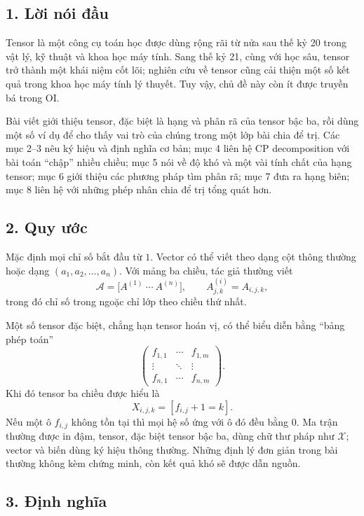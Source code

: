 \documentclass[11pt]{article}
\begin{document}
\subsection*{1. Lời nói đầu}

Tensor là một công cụ toán học được dùng rộng rãi từ nửa sau thế kỷ 20 trong
vật lý, kỹ thuật và khoa học máy tính. Sang thế kỷ 21, cùng với học sâu,
tensor trở thành một khái niệm cốt lõi; nghiên cứu về tensor cũng cải thiện
một số kết quả trong khoa học máy tính lý thuyết. Tuy vậy, chủ đề này còn ít
được truyền bá trong OI.

Bài viết giới thiệu tensor, đặc biệt là hạng và phân rã của tensor bậc ba, rồi
dùng một số ví dụ để cho thấy vai trò của chúng trong một lớp bài chia để trị.
Các mục 2--3 nêu ký hiệu và định nghĩa cơ bản; mục 4 liên hệ CP decomposition
với bài toán ``chập'' nhiều chiều; mục 5 nói về độ khó và một vài tính chất của
hạng tensor; mục 6 giới thiệu các phương pháp tìm phân rã; mục 7 đưa ra hạng
biên; mục 8 liên hệ với những phép nhân chia để trị tổng quát hơn.

\subsection*{2. Quy ước}

Mặc định mọi chỉ số bắt đầu từ \(1\). Vector có thể viết theo dạng cột thông
thường hoặc dạng \((a_1,a_2,\ldots,a_n)\). Với mảng ba chiều, tác giả thường
viết
\[
  \mathcal A=\bigl[A^{(1)}\ \cdots\ A^{(n)}\bigr],
  \qquad A^{(i)}_{j,k}=A_{i,j,k},
\]
trong đó chỉ số trong ngoặc chỉ lớp theo chiều thứ nhất.

Một số tensor đặc biệt, chẳng hạn tensor hoán vị, có thể biểu diễn bằng
``bảng phép toán''
\[
  \begin{pmatrix}
    f_{1,1} & \cdots & f_{1,m}\\
    \vdots & \ddots & \vdots\\
    f_{n,1} & \cdots & f_{n,m}
  \end{pmatrix}.
\]
Khi đó tensor ba chiều được hiểu là
\[
  X_{i,j,k}=[f_{i,j}+1=k].
\]
Nếu một ô \(f_{i,j}\) không tồn tại thì mọi hệ số ứng với ô đó đều bằng \(0\).
Ma trận thường được in đậm, tensor, đặc biệt tensor bậc ba, dùng chữ thư pháp
như \(\mathcal X\); vector và biến dùng ký hiệu thông thường. Những định lý
đơn giản trong bài thường không kèm chứng minh, còn kết quả khó sẽ được dẫn
nguồn.

\subsection*{3. Định nghĩa}
\end{document}
